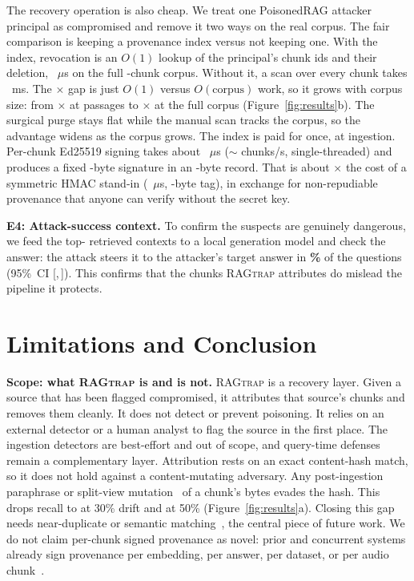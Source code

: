 \documentclass[12pt]{article}
\newcommand{\sysname}{\textsc{RAGtrap}\xspace}
\begin{document}
The recovery operation is also cheap. We treat one PoisonedRAG attacker principal
as compromised and remove it two ways on the real corpus. The fair comparison is
keeping a provenance index versus not keeping one. With the index, revocation is
an $O(1)$ lookup of the principal's \RevChunks{} chunk ids and their deletion,
\FullRevMttr~$\mu$s on the full \FullChunks{}-chunk corpus. Without it, a scan
over every chunk takes \FullManMttr~ms. The \FullMttrRatio$\times$ gap is just
$O(1)$ versus $O(\text{corpus})$ work, so it grows with corpus size: from
\SmallMttrRatio$\times$ at \SmallPassages{} passages to \FullMttrRatio$\times$ at
the full corpus (Figure~\ref{fig:results}b). The surgical purge stays flat while
the manual scan tracks the corpus, so the advantage widens as the corpus grows.
The index is paid for once, at ingestion. Per-chunk Ed25519 signing takes about
\EdLatency~$\mu$s ($\sim$\EdThroughput{} chunks/s, single-threaded) and produces
a fixed \EdSig{}-byte signature in an \EdRecord{}-byte record. That is about
\EdOverHmac$\times$ the cost of a symmetric HMAC stand-in (\HmacLatency~$\mu$s,
\HmacSig{}-byte tag), in exchange for non-repudiable provenance that anyone can
verify without the secret key.

\textbf{E4: Attack-success context.} To confirm the suspects are genuinely
dangerous, we feed the top-\AsrTopK{} retrieved contexts to a local \AsrGen{}
generation model and check the answer: the attack steers it to the attacker's
target answer in \textbf{\AsrPoint\%} of the \AsrN{} questions (95\%~CI
[\AsrLo{},\,\AsrHi{}]). This confirms that the chunks \sysname{} attributes do
mislead the pipeline it protects.

\section{Limitations and Conclusion}\label{sec:limits}

\textbf{Scope: what \sysname{} is and is not.} \sysname{} is a recovery layer.
Given a source that has been flagged compromised, it attributes that source's
chunks and removes them cleanly. It does not detect or prevent poisoning. It
relies on an external detector or a human analyst to flag the source in the first
place. The ingestion detectors are best-effort and out of scope, and query-time
defenses~\cite{gmtp,ragpartmask} remain a complementary layer. Attribution rests
on an exact content-hash match, so it does not hold against a content-mutating
adversary. Any post-ingestion paraphrase or split-view
mutation~\cite{carlini} of a chunk's bytes evades the hash. This drops recall to
\RTrecallDriftThree{} at 30\% drift and \RTrecallDriftFive{} at 50\%
(Figure~\ref{fig:results}a). Closing this gap needs near-duplicate or semantic
matching~\cite{broder1997minhash,charikar2002simhash,indyk1998lsh}, the central
piece of future work. We do not claim per-chunk signed provenance as novel:
prior and concurrent systems already sign provenance per embedding, per answer,
per dataset, or per audio chunk~\cite{VectorPin,leray2025policy,ZKPROV,MerkleSpeech}.
\end{document}
